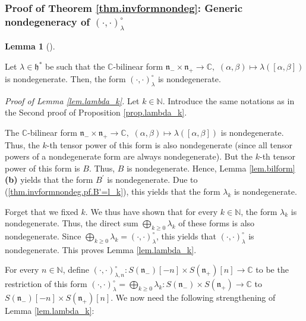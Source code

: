\documentclass
[numbers=enddot,12pt,final,onecolumn,german,notitlepage]{scrartcl}%
\theoremstyle{definition}
\newtheorem{lem}[theo]{Lemma}
\newenvironment{lemma}[1][]
{\begin{lem}[#1]\begin{leftbar}}
{\end{leftbar}\end{lem}}
\begin{document}
\subsubsection{Proof of Theorem \ref{thm.invformnondeg}: Generic nondegeneracy
of $\left(  \cdot,\cdot\right)  _{\lambda}^{\circ}$}

\begin{lemma}
\label{lem.lambda_k}Let $\lambda\in\mathfrak{h}^{\ast}$ be such that the
$\mathbb{C}$-bilinear form $\mathfrak{n}_{-}\times\mathfrak{n}_{+}%
\rightarrow\mathbb{C},$ $\left(  \alpha,\beta\right)  \mapsto\lambda\left(
\left[  \alpha,\beta\right]  \right)  $ is nondegenerate. Then, the form
$\left(  \cdot,\cdot\right)  _{\lambda}^{\circ}$ is nondegenerate.
\end{lemma}

\textit{Proof of Lemma \ref{lem.lambda_k}.} Let $k\in\mathbb{N}$. Introduce
the same notations as in the Second proof of Proposition \ref{prop.lambda_k}.

The $\mathbb{C}$-bilinear form $\mathfrak{n}_{-}\times\mathfrak{n}%
_{+}\rightarrow\mathbb{C},$ $\left(  \alpha,\beta\right)  \mapsto
\lambda\left(  \left[  \alpha,\beta\right]  \right)  $ is nondegenerate. Thus,
the $k$-th tensor power of this form is also nondegenerate (since all tensor
powers of a nondegenerate form are always nondegenerate). But the $k$-th
tensor power of this form is $B$. Thus, $B$ is nondegenerate. Hence, Lemma
\ref{lem.bilform} \textbf{(b)} yields that the form $B^{\prime}$ is
nondegenerate. Due to (\ref{thm.invformnondeg.pf.B'=l_k}), this yields that
the form $\lambda_{k}$ is nondegenerate.

Forget that we fixed $k$. We thus have shown that for every $k\in\mathbb{N}$,
the form $\lambda_{k}$ is nondegenerate. Thus, the direct sum $\bigoplus
\limits_{k\geq0}\lambda_{k}$ of these forms is also nondegenerate. Since
$\bigoplus\limits_{k\geq0}\lambda_{k}=\left(  \cdot,\cdot\right)  _{\lambda
}^{\circ}$, this yields that $\left(  \cdot,\cdot\right)  _{\lambda}^{\circ}$
is nondegenerate. This proves Lemma \ref{lem.lambda_k}.

For every $n\in\mathbb{N}$, define $\left(  \cdot,\cdot\right)  _{\lambda
,n}^{\circ}:S\left(  \mathfrak{n}_{-}\right)  \left[  -n\right]  \times
S\left(  \mathfrak{n}_{+}\right)  \left[  n\right]  \rightarrow\mathbb{C}$ to
be the restriction of this form $\left(  \cdot,\cdot\right)  _{\lambda}%
^{\circ}=\bigoplus\limits_{k\geq0}\lambda_{k}:S\left(  \mathfrak{n}%
_{-}\right)  \times S\left(  \mathfrak{n}_{+}\right)  \rightarrow\mathbb{C}$
to $S\left(  \mathfrak{n}_{-}\right)  \left[  -n\right]  \times S\left(
\mathfrak{n}_{+}\right)  \left[  n\right]  $. We now need the following
strengthening of Lemma \ref{lem.lambda_k}:
\end{document}
